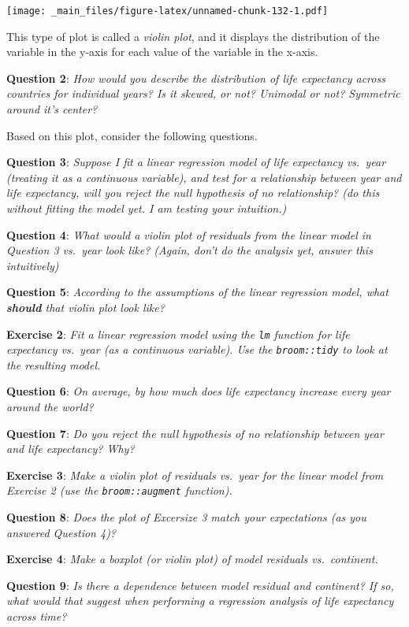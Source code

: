 \documentclass[]{article}
\theoremstyle{definition}
\theoremstyle{definition}
\theoremstyle{remark}
\begin{document}
\texttt{[image: \_main\_files/figure-latex/unnamed-chunk-132-1.pdf]}

This type of plot is called a \emph{violin plot}, and it displays the
distribution of the variable in the y-axis for each value of the
variable in the x-axis.

\textbf{Question 2}: \emph{How would you describe the distribution of
life expectancy across countries for individual years? Is it skewed, or
not? Unimodal or not? Symmetric around it's center?}

Based on this plot, consider the following questions.

\textbf{Question 3}: \emph{Suppose I fit a linear regression model of
life expectancy vs.~year (treating it as a continuous variable), and
test for a relationship between year and life expectancy, will you
reject the null hypothesis of no relationship? (do this without fitting
the model yet. I am testing your intuition.)}

\textbf{Question 4}: \emph{What would a violin plot of residuals from
the linear model in Question 3 vs.~year look like? (Again, don't do the
analysis yet, answer this intuitively)}

\textbf{Question 5}: \emph{According to the assumptions of the linear
regression model, what \textbf{should} that violin plot look like?}

\textbf{Exercise 2}: \emph{Fit a linear regression model using the
\texttt{lm} function for life expectancy vs.~year (as a continuous
variable). Use the \texttt{broom::tidy} to look at the resulting model.}

\textbf{Question 6}: \emph{On average, by how much does life expectancy
increase every year around the world?}

\textbf{Question 7}: \emph{Do you reject the null hypothesis of no
relationship between year and life expectancy? Why?}

\textbf{Exercise 3}: \emph{Make a violin plot of residuals vs.~year for
the linear model from Exercise 2 (use the \texttt{broom::augment}
function).}

\textbf{Question 8}: \emph{Does the plot of Excersize 3 match your
expectations (as you answered Question 4)?}

\textbf{Exercise 4}: \emph{Make a boxplot (or violin plot) of model
residuals vs.~continent.}

\textbf{Question 9}: \emph{Is there a dependence between model residual
and continent? If so, what would that suggest when performing a
regression analysis of life expectancy across time?}
\end{document}
